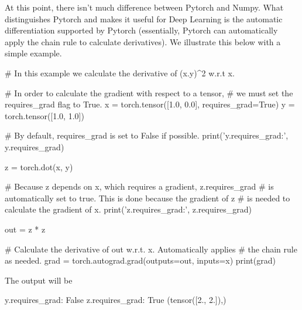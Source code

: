 At this point, there isn't much difference between Pytorch and Numpy. What distinguishes Pytorch and makes it useful for Deep Learning is the automatic differentiation supported by Pytorch (essentially, Pytorch can automatically apply the chain rule to calculate derivatives). We illustrate this below with a simple example.
\begin{python}
# In this example we calculate the derivative of (x.y)^2 w.r.t x.

# In order to calculate the gradient with respect to a tensor,
# we must set the requires_grad flag to True.
x = torch.tensor([1.0, 0.0], requires_grad=True)
y = torch.tensor([1.0, 1.0])

# By default, requires_grad is set to False if possible.
print('y.requires_grad:', y.requires_grad)

z = torch.dot(x, y)

# Because z depends on x, which requires a gradient, z.requires_grad
# is automatically set to true. This is done because the gradient of z
# is needed to calculate the gradient of x.
print('z.requires_grad:', z.requires_grad)

out = z * z

# Calculate the derivative of out w.r.t. x. Automatically applies
# the chain rule as needed.
grad = torch.autograd.grad(outputs=out, inputs=x)
print(grad)
\end{python}
The output will be
\begin{python}
y.requires_grad: False
z.requires_grad: True
(tensor([2., 2.]),)
\end{python}

